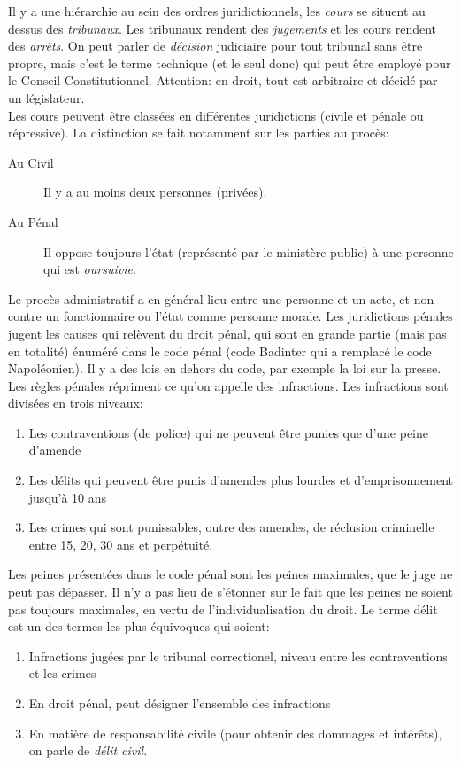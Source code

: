 \documentclass[math]{cours}
\begin{document}
	Il y a une hiérarchie au sein des ordres juridictionnels, les \emph{cours} se situent au dessus des \emph{tribunaux}.
	Les tribunaux rendent des \emph{jugements} et les cours rendent des \emph{arrêts}.
	On peut parler de \emph{décision} judiciaire pour tout tribunal sans être propre, mais c'est le terme technique (et le seul donc) qui peut être employé pour le Conseil Constitutionnel.
	Attention: en droit, tout est arbitraire et décidé par un législateur. \\

	Les cours peuvent être classées en différentes juridictions (civile et pénale ou répressive).
	La distinction se fait notamment sur les parties au procès:
	\begin{description}
		\item[Au Civil] Il y a au moins deux personnes (privées).
		\item[Au Pénal] Il oppose toujours l'état (représenté par le ministère public) à une personne qui est \emph{oursuivie}.
	\end{description}
	Le procès administratif a en général lieu entre une personne et un acte, et non contre un fonctionnaire ou l'état comme personne morale.
	Les juridictions pénales jugent les causes qui relèvent du droit pénal, qui sont en grande partie (mais pas en totalité) énuméré dans le code pénal (code Badinter qui a remplacé le code Napoléonien).
	Il y a des lois en dehors du code, par exemple la loi sur la presse.
	Les règles pénales répriment ce qu'on appelle des infractions.
	Les infractions sont divisées en trois niveaux:
	\begin{enumerate}
		\item Les contraventions (de police) qui ne peuvent être punies que d'une peine d'amende
		\item Les délits qui peuvent être punis d'amendes plus lourdes et d'emprisonnement jusqu'à 10 ans
		\item Les crimes qui sont punissables, outre des amendes, de réclusion criminelle entre 15, 20, 30 ans et perpétuité.
	\end{enumerate}
	Les peines présentées dans le code pénal sont les peines maximales, que le juge ne peut pas dépasser.
	Il n'y a pas lieu de s'étonner sur le fait que les peines ne soient pas toujours maximales, en vertu de l'individualisation du droit.
	Le terme délit est un des termes les plus équivoques qui soient:
	\begin{enumerate}
		\item Infractions jugées par le tribunal correctionel, niveau entre les contraventions et les crimes
		\item En droit pénal, peut désigner l'ensemble des infractions
		\item En matière de responsabilité civile (pour obtenir des dommages et intérêts), on parle de \emph{délit civil}.
	\end{enumerate}
\end{document}
